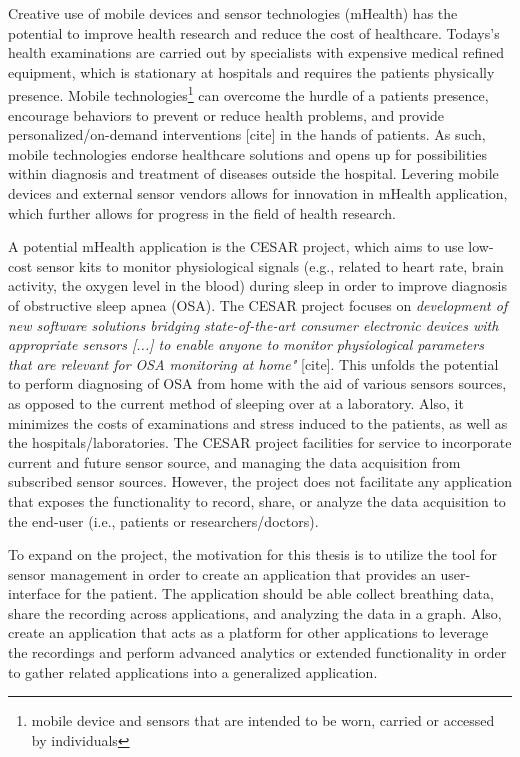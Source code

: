 Creative use of mobile devices and sensor technologies (mHealth) has the potential to improve health research and reduce the cost of healthcare. Todays's health examinations are carried out by specialists with expensive medical refined equipment, which is stationary at hospitals and requires the patients physically presence.  Mobile technologies\footnote{mobile device and sensors that are intended to be worn, carried or accessed by individuals} can overcome the hurdle of a patients presence, encourage behaviors to prevent or reduce health problems, and provide personalized/on-demand interventions [cite] in the hands of patients. As such, mobile technologies endorse healthcare solutions and opens up for possibilities within diagnosis and treatment of diseases outside the hospital. Levering mobile devices and external sensor vendors allows for innovation in mHealth application, which further allows for progress in the field of health research.   

A potential mHealth application is the CESAR project, which aims to use low-cost sensor kits to monitor physiological signals (e.g., related to heart rate, brain activity, the oxygen level in the blood) during sleep in order to improve diagnosis of obstructive sleep apnea (OSA). The CESAR project focuses on \textit{development of new software solutions bridging state-of-the-art consumer electronic devices with appropriate sensors [...] to enable anyone to monitor physiological parameters that are relevant for OSA monitoring at home"} [cite]. This unfolds the potential to perform diagnosing of OSA from home with the aid of various sensors sources, as opposed to the current method of sleeping over at a laboratory. Also, it minimizes the costs of examinations and stress induced to the patients, as well as the hospitals/laboratories. The CESAR project facilities for service to incorporate current and future sensor source, and managing the data acquisition from subscribed sensor sources. However, the project does not facilitate any application that exposes the functionality to record, share, or analyze the data acquisition to the end-user (i.e., patients or researchers/doctors). 

To expand on the project, the motivation for this thesis is to utilize the tool for sensor management in order to create an application that provides an user-interface for the patient. The application should be able collect breathing data, share the recording across applications, and analyzing the data in a graph. Also, create an application that acts as a platform for other applications to leverage the recordings and perform advanced analytics or extended functionality in order to gather related applications into a generalized application.

